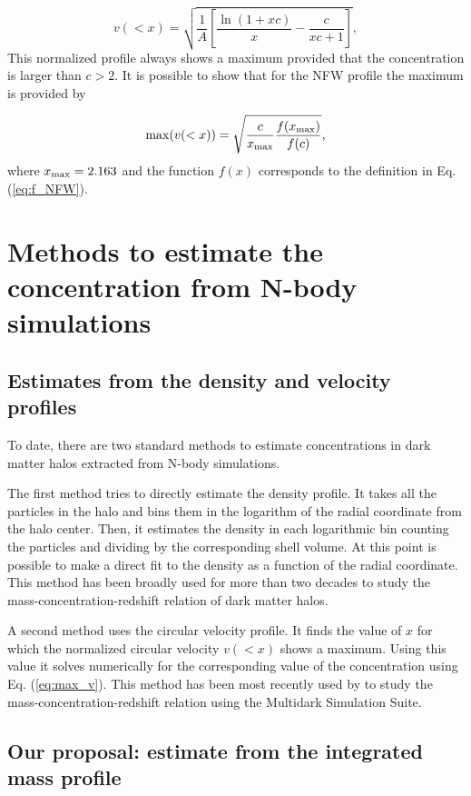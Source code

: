 \documentclass[a4,useAMS,usenatbib,usegraphicx]{mn2e}
\begin{document}
\begin{equation}
v(<x)=\sqrt{\frac{1}{A}\left[\frac{\ln\left(1+xc\right)}{x}-\frac{c}{xc+1}\right]},
\end{equation}
%
This normalized profile always shows a maximum provided that the
concentration is larger than $c>2$.
It is possible to show that for the NFW profile the maximum is
provided by

\begin{equation}
\mathrm{max}(v(<x)) = \sqrt{\frac{c}{x_{\rm max}}\frac{f(x_{\rm
      max})}{f(c)}},
\label{eq:max_v}
\end{equation}
where $x_{\rm max}=2.163$ \citep{Klypin2014} and the function $f(x)$
corresponds to the definition in Eq. (\ref{eq:f_NFW}).

\section{Methods to estimate the concentration from N-body simulations}
\label{sec:method}

\subsection{Estimates from the density and velocity profiles}

To date, there are two standard methods to estimate concentrations in
dark matter halos extracted from N-body simulations. 

The first method tries to directly estimate the density profile.  
It takes all the particles in the halo and bins them in the logarithm of
the radial coordinate from the halo center.  
Then, it estimates the density in each logarithmic bin counting the
particles and dividing by the corresponding shell volume.  
At this point is possible to make a direct fit to the density as a
function of the radial coordinate. 
This method has been broadly used for more than two decades to study
the mass-concentration-redshift relation of dark matter halos.
 
A second method uses the circular velocity profile.  
It finds the value of $x$ for which the normalized circular velocity
$v(<x)$ shows a maximum.  
Using this value it solves numerically for the corresponding value of
the concentration using Eq. (\ref{eq:max_v}). 
This method has been most recently used by \cite{Klypin2014} to study
the mass-concentration-redshift relation using the Multidark
Simulation Suite. 


\subsection{Our proposal: estimate from the integrated mass profile}
\end{document}
